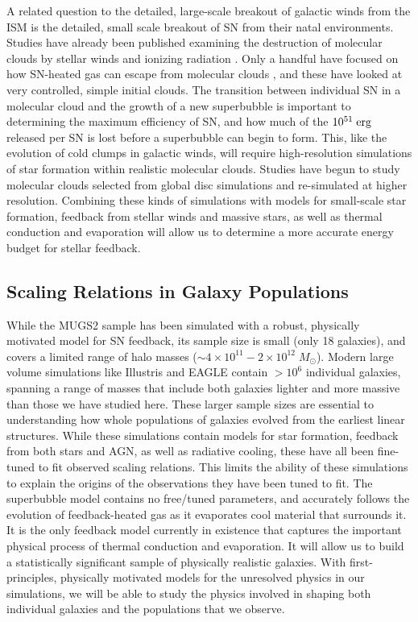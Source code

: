 A related question to the detailed, large-scale breakout of galactic winds from
the ISM is the detailed, small scale breakout of SN from their natal
environments.  Studies have already been published examining the destruction of
molecular clouds by stellar winds and ionizing radiation
\citep{Murray2010,Walch2012}.  Only a handful have focused on how SN-heated gas
can escape from molecular clouds \citep{Rogers2013}, and these have looked at
very controlled, simple initial clouds.  The transition between individual
SN in a molecular cloud and the growth of a new superbubble is 
important to determining the maximum efficiency of SN, and how much 
of the $10^{51}\;\rm{erg}$ released per SN is lost before a superbubble can begin
to form.  This, like the evolution of cold clumps in galactic winds, will
require high-resolution simulations of star formation within realistic molecular
clouds.  Studies have begun \citep{Dobbs2015} to study molecular clouds selected
from global disc simulations and re-simulated at higher resolution.  Combining
these kinds of simulations with models for small-scale star formation, feedback
from stellar winds and massive stars, as well as thermal conduction and
evaporation will allow us to determine a more accurate energy budget for stellar
feedback.

\subsection{Scaling Relations in Galaxy Populations}
While the MUGS2 sample has been simulated with a robust, physically motivated
model for SN feedback, its sample size is small (only 18 galaxies), and covers a
limited range of halo masses ($\sim 4\times10^{11}-2\times10^{12}\;M_\odot$).
Modern large volume simulations like Illustris \citep{Vogelsberger2014b} and
EAGLE \citep{Schaye2015} contain $>10^6$ individual galaxies, spanning a range
of masses that include both galaxies lighter and more massive than those we have
studied here.  These larger sample sizes are essential to understanding how
whole populations of galaxies evolved from the earliest linear structures.
While these simulations contain models for star formation, feedback from both
stars and AGN, as well as radiative cooling, these have all been fine-tuned to
fit observed scaling relations.  This limits the ability of these simulations to
explain the origins of the observations they have been tuned to fit.  The
superbubble model contains no free/tuned parameters, and accurately follows the
evolution of feedback-heated gas as it evaporates cool material that surrounds
it.  It is the only feedback model currently in existence that captures the
important physical process of thermal conduction and evaporation.  It will allow
us to build a statistically significant sample of physically realistic galaxies.
With first-principles, physically motivated models for the unresolved physics in
our simulations, we will be able to study the physics involved in shaping
both individual galaxies and the populations that we observe. 

